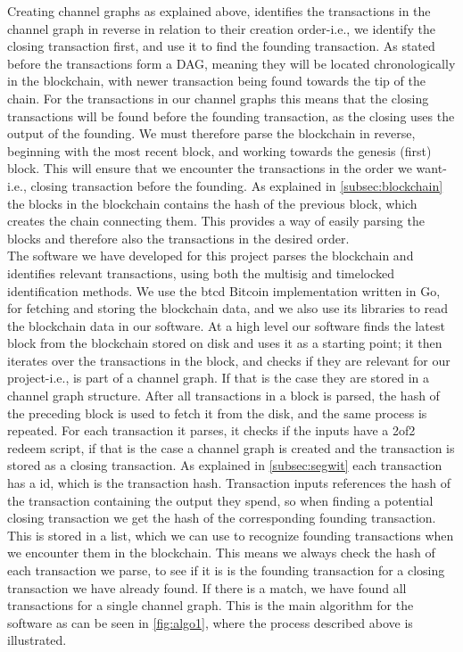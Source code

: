 Creating channel graphs as explained above, identifies the transactions in the channel graph in reverse in relation to their creation order-i.e., we identify the closing transaction first, and use it to find the founding transaction. As stated before the transactions form a DAG, meaning they will be located chronologically in the blockchain, with newer transaction being found towards the tip of the chain. For the transactions in our channel graphs this means that the closing transactions will be found before the founding transaction, as the closing uses the output of the founding.
We must therefore parse the blockchain in reverse, beginning with the most recent block, and working towards the genesis (first) block.
This will ensure that we encounter the transactions in the order we want-i.e., closing transaction before the founding.
As explained in \cref{subsec:blockchain} the  blocks in the blockchain contains the hash of the previous block, which creates the chain connecting them. This provides a way of easily parsing the blocks and therefore also the transactions in the desired order. 
\\

The software we have developed for this project parses the blockchain and identifies relevant transactions, using both the multisig and timelocked identification methods.
We use the btcd \cite{btcd_roasbeef} Bitcoin implementation written in Go, for fetching and storing the blockchain data, and we also use its libraries to read the blockchain data in our software.
At a high level our software finds the latest block from the blockchain stored on disk and uses it as a starting point;
it then iterates over the transactions in the block, and checks if they are relevant for our project-i.e., is part of a channel graph. If that is the case they are stored in a channel graph structure. After all transactions in a block is parsed, the hash of the preceding block is used to fetch it from the disk, and the same process is repeated.
For each transaction it parses, it checks if the inputs have a 2of2 redeem script, if that is the case a channel graph is created and the transaction is stored as a closing transaction.
As explained in \cref{subsec:segwit} each transaction has a id, which is the transaction hash.
Transaction inputs references the hash of the transaction containing the output they spend, so when finding a potential closing transaction we get the hash of the corresponding founding transaction.
This is stored in a list, which we can use to recognize founding transactions when we encounter them in the blockchain.
This means we always check the hash of each transaction we parse, to see if it is is the founding transaction for a closing transaction we have already found. If there is a match, we have found all transactions for a single channel graph. This is the main algorithm for the software as can be seen in \cref{fig:algo1}, where the process described above is illustrated.


